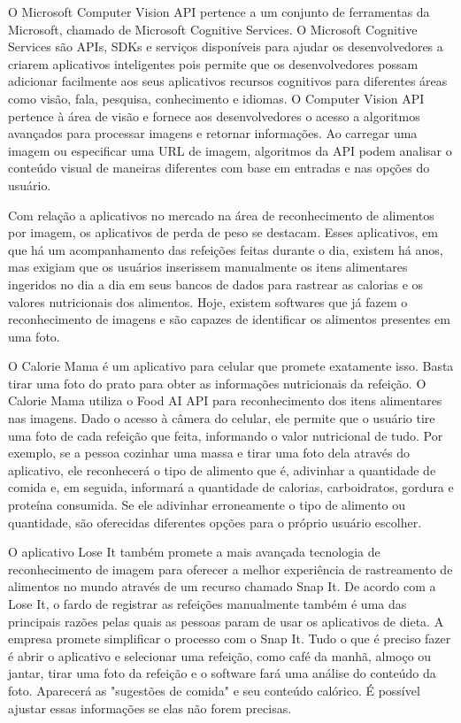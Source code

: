 O Microsoft Computer Vision API \cite{azure_microsoft_computer_vision} pertence a um conjunto de ferramentas da Microsoft, chamado de Microsoft Cognitive Services. O Microsoft Cognitive Services são APIs, SDKs e serviços disponíveis para ajudar os desenvolvedores a criarem aplicativos inteligentes pois permite que os desenvolvedores possam adicionar facilmente aos seus aplicativos recursos cognitivos para diferentes áreas como visão, fala, pesquisa, conhecimento e idiomas. O Computer Vision API pertence à área de visão e fornece aos desenvolvedores o acesso a algoritmos avançados para processar imagens e retornar informações. Ao carregar uma imagem ou especificar uma URL de imagem, algoritmos da API podem analisar o conteúdo visual de maneiras diferentes com base em entradas e nas opções do usuário.

Com relação a aplicativos no mercado na área de reconhecimento de alimentos por imagem, os aplicativos de perda de peso se destacam. Esses aplicativos, em que há um acompanhamento das refeições feitas durante o dia, existem há anos, mas exigiam que os usuários inserissem manualmente os itens alimentares ingeridos no dia a dia em seus bancos de dados para rastrear as calorias e os valores nutricionais dos alimentos. Hoje, existem softwares que já fazem o reconhecimento de imagens e são capazes de identificar os alimentos presentes em uma foto.

O Calorie Mama \cite{caloriemama_2016} é um aplicativo para celular que promete exatamente isso. Basta tirar uma foto do prato para obter as informações nutricionais da refeição. O Calorie Mama utiliza o Food AI API para reconhecimento dos itens alimentares nas imagens. Dado o acesso à câmera do celular, ele permite que o usuário tire uma foto de cada refeição que feita, informando o valor nutricional de tudo. Por exemplo, se a pessoa cozinhar uma massa e tirar uma foto dela através do aplicativo, ele reconhecerá o tipo de alimento que é, adivinhar a quantidade de comida e, em seguida, informará a quantidade de calorias, carboidratos, gordura e proteína consumida. Se ele adivinhar erroneamente o tipo de alimento ou quantidade, são oferecidas diferentes opções para o próprio usuário escolher.

O aplicativo Lose It \cite{lose_it} também promete a mais avançada tecnologia de reconhecimento de imagem para oferecer a melhor experiência de rastreamento de alimentos no mundo através de um recurso chamado Snap It.  De acordo com a Lose It, o fardo de registrar as refeições manualmente também é uma das principais razões pelas quais as pessoas param de usar os aplicativos de dieta. A empresa promete simplificar o processo com o Snap It. Tudo o que é preciso fazer é abrir o aplicativo e selecionar uma refeição, como café da manhã, almoço ou jantar, tirar uma foto da refeição e o software fará uma análise do conteúdo da foto. Aparecerá as "sugestões de comida" e seu conteúdo calórico. É possível ajustar essas informações se elas não forem precisas.

